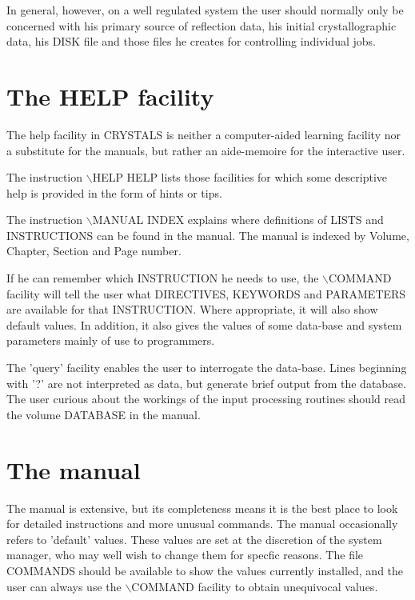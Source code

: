 \documentclass[10pt,a4paper]{report}
\begin{document}
In general, however, on a well regulated system the user should normally
 only be concerned with his primary source of reflection data, his initial
 crystallographic data, his DISK file and those files he creates
 for controlling individual jobs.
\section{The HELP facility }


The help facility in CRYSTALS is neither a computer-aided learning
 facility nor a substitute for the manuals, but rather an aide-memoire
 for the interactive user.


The instruction $\backslash$HELP HELP lists those facilities for which some 
 descriptive help is provided in the form of hints or tips. 


The instruction $\backslash$MANUAL INDEX explains where definitions
 of LISTS and INSTRUCTIONS can be found in the manual. The manual is
 indexed by Volume, Chapter, Section and Page number.


If he can remember which INSTRUCTION he needs
 to use, the $\backslash$COMMAND facility will tell
 the user  what DIRECTIVES, KEYWORDS and
 PARAMETERS are available for that INSTRUCTION.
 Where appropriate, it will also show default values.
 In addition, it also gives the values of some data-base and system parameters
 mainly of use to programmers.


The 'query' facility enables the user to interrogate the data-base.
 Lines beginning with '?' are not interpreted as data, but generate brief
 output from the database.
 The user curious about the workings of the 
 input processing routines should read the volume  DATABASE in the manual.  



\section{The manual}


 


The manual is extensive, but its completeness means it is the best place to look for detailed instructions and more unusual commands. The manual  occasionally refers to 'default' values. These values are set
 at the discretion
 of the system manager, who may well wish to change them for specfic reasons. 
 The file COMMANDS should be available to show the values currently installed,
 and the user can always use the $\backslash$COMMAND facility to obtain unequivocal
 values.
\end{document}
